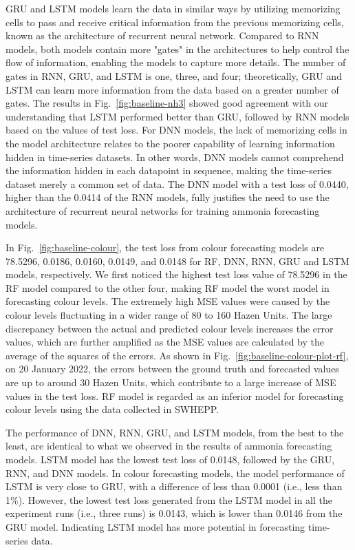 GRU and LSTM models learn the data in similar ways by utilizing memorizing cells to pass and receive critical information from the previous memorizing cells, known as the architecture of recurrent neural network. Compared to RNN models, both models contain more "gates" in the architectures to help control the flow of information, enabling the models to capture more details. The number of gates in RNN, GRU, and LSTM is one, three, and four; theoretically, GRU and LSTM can learn more information from the data based on a greater number of gates. The results in Fig.~\ref{fig:baseline-nh3} showed good agreement with our understanding that LSTM performed better than GRU, followed by RNN models based on the values of test loss. For DNN models, the lack of memorizing cells in the model architecture relates to the poorer capability of learning information hidden in time-series datasets. In other words, DNN models cannot comprehend the information hidden in each datapoint in sequence, making the time-series dataset merely a common set of data. The DNN model with a test loss of 0.0440, higher than the 0.0414 of the RNN models, fully justifies the need to use the architecture of recurrent neural networks for training ammonia forecasting models.

In Fig.~\ref{fig:baseline-colour}, the test loss from colour forecasting models are 78.5296, 0.0186, 0.0160, 0.0149, and 0.0148 for RF, DNN, RNN, GRU and LSTM models, respectively. We first noticed the highest test loss value of 78.5296 in the RF model compared to the other four, making RF model the worst model in forecasting colour levels. The extremely high MSE values were caused by the colour levels fluctuating in a wider range of 80 to 160 Hazen Units. The large discrepancy between the actual and predicted colour levels increases the error values, which are further amplified as the MSE values are calculated by the average of the squares of the errors. As shown in Fig.~\ref{fig:baseline-colour-plot-rf}, on 20 January 2022, the errors between the ground truth and forecasted values are up to around 30 Hazen Units, which contribute to a large increase of MSE values in the test loss. RF model is regarded as an inferior model for forecasting colour levels using the data collected in SWHEPP.

The performance of DNN, RNN, GRU, and LSTM models, from the best to the least, are identical to what we observed in the results of ammonia forecasting models. LSTM model has the lowest test loss of 0.0148, followed by the GRU, RNN, and DNN models. In colour forecasting models, the model performance of LSTM is very close to GRU, with a difference of less than 0.0001 (i.e., less than 1\%). However, the lowest test loss generated from the LSTM model in all the experiment runs (i.e., three runs) is 0.0143, which is lower than 0.0146 from the GRU model. Indicating LSTM model has more potential in forecasting time-series data.


